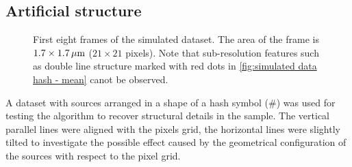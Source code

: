 \afterpage{\clearpage}
\subsection{Artificial structure\label{sub:Simul hash}}
% 
\begin{figure}[!tb]	
	\newcommand{\widthfig}{.9\textwidth}
	\centering	
	
	
	

	\caption{First eight frames of the simulated dataset. The area of the frame is $1.7\times1.7\, \mathrm{\mu m}$ ($21\times21$ pixels). Note that sub-resolution features such as double line structure marked with red dots in \autoref{fig:simulated data hash - mean} canot be observed.}
	\label{fig:simulated data hash}
\end{figure} 

A dataset with sources arranged in a shape of a hash symbol (\#) was used for testing the algorithm to recover structural details in the sample. The vertical parallel lines were aligned with the pixels grid, the horizontal lines were slightly tilted to investigate the possible effect caused by the geometrical configuration of the sources with respect to the pixel grid. 

